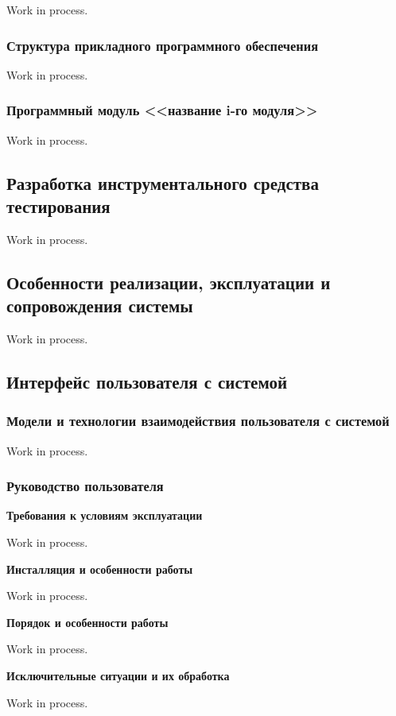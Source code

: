 Work in process.

\subsubsection{Структура прикладного программного обеспечения}

Work in process.

\subsubsection{Программный модуль <<название i-го модуля>>}

Work in process.

\subsection{Разработка инструментального средства тестирования}

Work in process.

\subsection{Особенности реализации, эксплуатации и сопровождения системы}

Work in process.

\subsection{Интерфейс пользователя с системой}

\subsubsection{Модели и технологии взаимодействия пользователя с системой}

Work in process.

\subsubsection{Руководство пользователя}

\textbf{Требования к условиям эксплуатации}

Work in process.

\textbf{Инсталляция и особенности работы}

Work in process.

\textbf{Порядок и особенности работы}

Work in process.

\textbf{Исключительные ситуации и их обработка}

Work in process.

\clearpage
\newpage